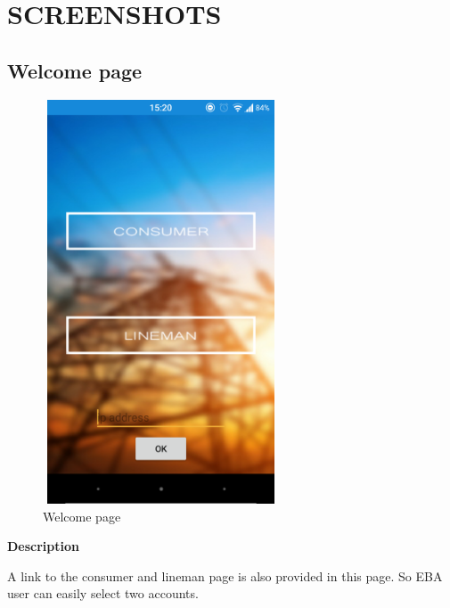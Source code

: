 \documentclass[12pt,a4paper,oneside]{report}
\begin{document}
\newpage
\section{SCREENSHOTS}
\subsection{Welcome page}
\begin{figure}[H]
	\begin{center}
		\includegraphics[width=7cm,height=12cm]{startup.png}
			\caption{Welcome page}
			\label{Welcome page}
	\end{center}
\end{figure}
\textbf{Description}
\par A link to the consumer and lineman page is also provided in this page. So EBA user can easily select two accounts.

\newpage
\end{document}
